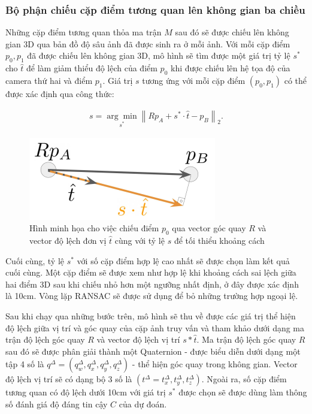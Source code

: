 \subsubsection{Bộ phận chiếu cặp điểm tương quan lên không gian ba chiều}

Những cặp điểm tương quan thỏa ma trận $M$ sau đó sẽ được chiếu lên không gian 3D qua bản đồ độ sâu ảnh đã được sinh ra ở mỗi ảnh. Với mỗi cặp điểm $p_0, p_1$ đã được chiếu lên không gian 3D, mô hình sẽ tìm được một giá trị tỷ lệ $s^*$ cho $\hat{t}$ để làm giảm thiểu độ lệch của điểm $p_0$ khi được chiếu lên hệ tọa độ của camera thứ hai và điểm $p_1$. Giá trị $s$ tương ứng với mỗi cặp điểm $(p_0, p_1)$ có thể được xác định qua công thức:

$$
  \begin{aligned}
    s=\underset{s^*}{\arg \min }\left\|R p_A+s^* \cdot \hat{t}-p_B\right\|_2 .
  \end{aligned}
$$

\begin{figure}[H]
  \centering
  \includegraphics[scale=1]{pics/Proposal/reprojection.png}
  \caption[Minh họa cho việc xác định tỷ lệ $s$ bằng độ sâu ảnh]{Hình minh họa cho việc chiếu điểm $p_0$ qua vector góc quay $R$ và vector độ lệch đơn vị $\hat{t}$ cùng với tỷ lệ $s$ để tối thiểu khoảng cách \cite{arnold2022mapfree}}
\end{figure}

Cuối cùng, tỷ lệ $s^*$ với số cặp điểm hợp lệ cao nhất sẽ được chọn làm kết quả cuối cùng. Một cặp điểm sẽ được xem như hợp lệ khi khoảng cách sai lệch giữa hai điểm 3D sau khi chiếu nhỏ hơn một ngưỡng nhất định, ở đây được xác định là 10cm. Vòng lặp RANSAC sẽ được sử dụng để bỏ những trường hợp ngoại lệ.

Sau khi chạy qua những bước trên, mô hình sẽ thu về được các giá trị thể hiện độ lệch giữa vị trí và góc quay của cặp ảnh truy vấn và tham khảo dưới dạng ma trận độ lệch góc quay $R$ và vector độ lệch vị trí $s*\hat{t}$. Ma trận độ lệch góc quay $R$ sau đó sẽ được phân giải thành một Quaternion - được biểu diễn dưới dạng một tập 4 số là $q^{\Delta} = (q^{\Delta}_w,q^{\Delta}_x,q^{\Delta}_y,q^{\Delta}_z)$ - thể hiện góc quay trong không gian. Vector độ lệch vị trí sẽ có dạng bộ 3 số là $(t^{\Delta} = t^{\Delta}_x,t^{\Delta}_y,t^{\Delta}_z)$. Ngoài ra, số cặp điểm tương quan có độ lệch dưới 10cm với giá trị $s^*$ được chọn sẽ được dùng làm thông số đánh giá độ đáng tin cậy $C$ của dự đoán.


